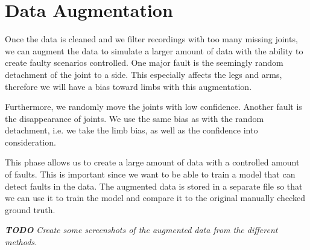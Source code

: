 \section{Data Augmentation}
\label{sec:data_augmentation}

Once the data is cleaned and we filter recordings with too many missing joints, we can augment the data to simulate a larger amount of data with the ability to create faulty scenarios controlled. One major fault is the seemingly random detachment of the joint to a side. This especially affects the legs and arms, therefore we will have a bias toward limbs with this augmentation. 

Furthermore, we randomly move the joints with low confidence. Another fault is the disappearance of joints. We use the same bias as with the random detachment, i.e. we take the limb bias, as well as the confidence into consideration.

This phase allows us to create a large amount of data with a controlled amount of faults. This is important since we want to be able to train a model that can detect faults in the data. The augmented data is stored in a separate file so that we can use it to train the model and compare it to the original manually checked ground truth.

\textit{\textbf{TODO} Create some screenshots of the augmented data from the different methods.}